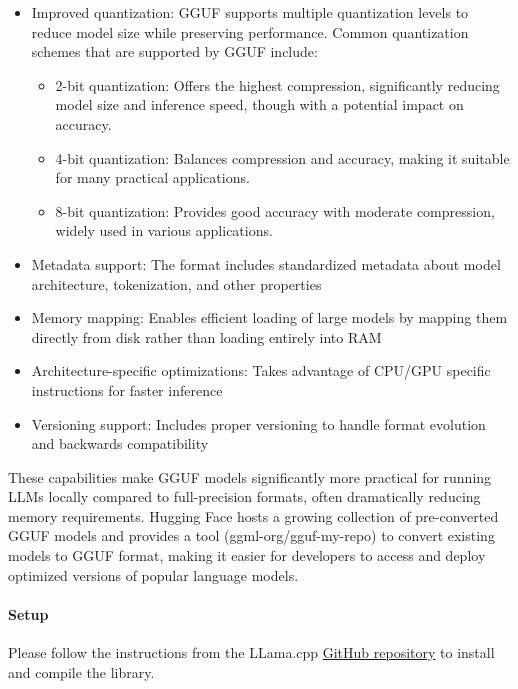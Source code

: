 \begin{itemize}
    \item Improved quantization: GGUF supports multiple quantization levels to reduce model size while preserving performance. Common quantization schemes that are supported by GGUF include:
    \begin{itemize}
        \item 2-bit quantization: Offers the highest compression, significantly reducing model size and inference speed, though with a potential impact on accuracy.
        \item 4-bit quantization: Balances compression and accuracy, making it suitable for many practical applications.
        \item 8-bit quantization: Provides good accuracy with moderate compression, widely used in various applications.
    \end{itemize}
    \item Metadata support: The format includes standardized metadata about model architecture, tokenization, and other properties
    \item Memory mapping: Enables efficient loading of large models by mapping them directly from disk rather than loading entirely into RAM
    \item Architecture-specific optimizations: Takes advantage of CPU/GPU specific instructions for faster inference
    \item Versioning support: Includes proper versioning to handle format evolution and backwards compatibility
\end{itemize}

These capabilities make GGUF models significantly more practical for running LLMs locally compared to full-precision formats, often dramatically reducing memory requirements. Hugging Face hosts a growing collection of pre-converted GGUF models  and provides a tool (ggml-org/gguf-my-repo) to convert existing models to GGUF format, making it easier for developers to access and deploy optimized versions of popular language models.

\paragraph{Setup}

Please follow the instructions from the LLama.cpp \href{https://github.com/ggerganov/llama.cpp}{GitHub repository}  to install and compile the library.

